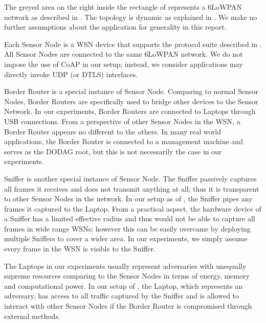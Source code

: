 \begin{description}[style=nextline]
	\item[WSN]
	The greyed area on the right inside the rectangle of  represents a 6LoWPAN network as described in . The topology is dynamic as explained in .  We make no further assumptions about the application for generality in this report.
	
	\item[Sensor Node]
	Each Sensor Node is a WSN device that supports the protocol suite described in . All Sensor Nodes are connected to the same 6LoWPAN network. We do not impose the use of CoAP in our setup; instead, we consider applications may directly invoke UDP (or DTLS) interfaces. 
	
	\item[Border Router]
	Border Router is a special instance of Sensor Node. Comparing to normal Sensor Nodes, Border Routers are specifically used to bridge other devices to the Sensor Network. In our experiments, Border Routers are connected to Laptops through USB connections. From a perspective of other Sensor Nodes in the WSN, a Border Router appears no different to the others. In many real world applications, the Border Router is connected to a management machine and serves as the DODAG root, but this is not necessarily the case in our experiments.
	
	\item[Sniffer]
	Sniffer is another special instance of Sensor Node. The Sniffer passively captures all frames it receives and does not transmit anything at all; thus it is transparent to other Sensor Nodes in the network. In our setup as of , the Sniffer pipes any frames it captured to the Laptop. From a practical aspect, the hardware device of a Sniffer has a limited effective radius and thus would not be able to capture all frames in wide range WSNs; however this can be easily overcame by deploying multiple Sniffers to cover a wider area. In our experiments, we simply assume every frame in the WSN is visible to the Sniffer.
	
	\item[Laptop]
	The Laptops in our experiments usually represent adversaries with unequally supreme resources comparing to the Sensor Nodes in terms of energy, memory and computational power. In our setup of , the Laptop, which represents an adversary, has access to all traffic captured by the Sniffer and is allowed to interact with other Sensor Nodes if the Border Router is compromised through external methods.
\end{description}

